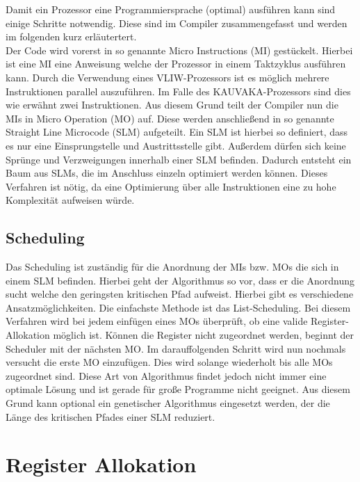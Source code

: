 Damit ein Prozessor eine Programmiersprache (optimal) ausführen kann sind einige Schritte notwendig. Diese sind im Compiler zusammengefasst und werden im folgenden kurz erläutertert.\\
Der Code wird vorerst in so genannte Micro Instructions (MI) gestückelt.  Hierbei ist eine MI eine Anweisung welche der Prozessor in einem Taktzyklus ausführen kann. Durch die Verwendung eines VLIW-Prozessors ist es möglich mehrere Instruktionen parallel auszuführen. Im Falle des KAUVAKA-Prozessors sind dies wie erwähnt zwei Instruktionen. Aus diesem Grund teilt der Compiler nun die MIs in Micro Operation (MO) auf. Diese werden anschließend in so genannte \glqq Straight Line Microcode\grqq{} (SLM) aufgeteilt. Ein SLM ist hierbei so definiert, dass es nur eine Einsprungstelle und Austrittsstelle gibt. Außerdem dürfen sich keine Sprünge und Verzweigungen innerhalb einer SLM befinden.  Dadurch entsteht ein Baum aus SLMs, die im Anschluss einzeln optimiert werden können. Dieses Verfahren ist nötig, da eine Optimierung über alle Instruktionen eine zu hohe Komplexität aufweisen würde. \cite{landskov1980local}
\subsection{Scheduling}
\label{sec:scheduling}
Das Scheduling ist zuständig für die Anordnung der MIs bzw. MOs die sich in einem SLM befinden. Hierbei geht der Algorithmus so vor, dass er die Anordnung sucht welche den geringsten kritischen Pfad aufweist. Hierbei gibt es verschiedene Ansatzmöglichkeiten. Die einfachste Methode ist das List-Scheduling. Bei diesem Verfahren wird bei jedem einfügen eines MOs überprüft, ob eine valide Register-Allokation möglich ist. Können die Register nicht zugeordnet werden, beginnt der Scheduler mit der nächsten MO. Im darauffolgenden Schritt wird nun nochmals versucht die erste MO einzufügen. Dies wird solange wiederholt bis alle MOs zugeordnet sind.\cite{landskov1980local}
Diese Art von Algorithmus findet jedoch nicht immer eine optimale Lösung und ist gerade für große Programme nicht geeignet. Aus diesem Grund kann optional ein genetischer Algorithmus eingesetzt werden, der die Länge des kritischen Pfades einer SLM reduziert.


\section{Register Allokation}
\label{sec:register allok}
